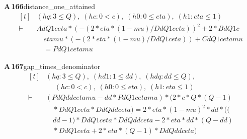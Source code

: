 \documentclass[conference]{IEEEtran}
\theoremstyle{definition}
\newcommand{\lean}[1]{\textsf{\footnotesize #1}}
\begin{document}
\noindent\textbf{A\,166}\quad\lean{distance\_one\_attained}
{\footnotesize\[ \begin{aligned}[t]
&(\mathit{hq} : 3 \leq \mathit{Q}),\; (\mathit{hc} : 0 < \mathit{c}),\; (\mathit{h0} : 0 \leq \mathit{eta}),\; (\mathit{h1} : \mathit{eta} \leq 1)\\
\vdash\;&\mathit{Ad} \mathit{Q} 1 \mathit{c} \mathit{eta} * (-(2 * \mathit{eta} * (1 - \mathit{mu}) / \mathit{Dd} \mathit{Q} 1 \mathit{c} \mathit{eta})) ^{2} + 2 * \mathit{Bd} \mathit{Q} 1 \mathit{c}\\
&\quad \mathit{eta} \mathit{mu} * (-(2 * \mathit{eta} * (1 - \mathit{mu}) / \mathit{Dd} \mathit{Q} 1 \mathit{c} \mathit{eta})) + \mathit{Cd} \mathit{Q} 1 \mathit{c} \mathit{eta} \mathit{mu}\\
&\quad = \mathit{Pd} \mathit{Q} 1 \mathit{c} \mathit{eta} \mathit{mu}
\end{aligned} \]}

\noindent\textbf{A\,167}\quad\lean{gap\_times\_denominator}
{\footnotesize\[ \begin{aligned}[t]
&(\mathit{hq} : 3 \leq \mathit{Q}),\; (\mathit{hd1} : 1 \leq \mathit{dd}),\; (\mathit{hdq} : \mathit{dd} \leq \mathit{Q}),\\
&\quad \; (\mathit{hc} : 0 < \mathit{c}),\; (\mathit{h0} : 0 \leq \mathit{eta}),\; (\mathit{h1} : \mathit{eta} \leq 1)\\
\vdash\;&(\mathit{Pd} \mathit{Q} \mathit{dd} \mathit{c} \mathit{eta} \mathit{mu} - \mathit{dd} * \mathit{Pd} \mathit{Q} 1 \mathit{c} \mathit{eta} \mathit{mu}) * (2 * \mathit{c} * \mathit{Q} * (\mathit{Q} - 1)\\
&\quad * \mathit{Dd} \mathit{Q} 1 \mathit{c} \mathit{eta} * \mathit{Dd} \mathit{Q} \mathit{dd} \mathit{c} \mathit{eta}) = 2 * \mathit{eta} * (1 - \mathit{mu}) ^{2} * \mathit{dd} * ((\\
&\quad \mathit{dd} - 1) * \mathit{Dd} \mathit{Q} 1 \mathit{c} \mathit{eta} * \mathit{Dd} \mathit{Q} \mathit{dd} \mathit{c} \mathit{eta} - 2 * \mathit{eta} * \mathit{dd} * (\mathit{Q} - \mathit{dd})\\
&\quad * \mathit{Dd} \mathit{Q} 1 \mathit{c} \mathit{eta} + 2 * \mathit{eta} * (\mathit{Q} - 1) * \mathit{Dd} \mathit{Q} \mathit{dd} \mathit{c} \mathit{eta})
\end{aligned} \]}
\end{document}

